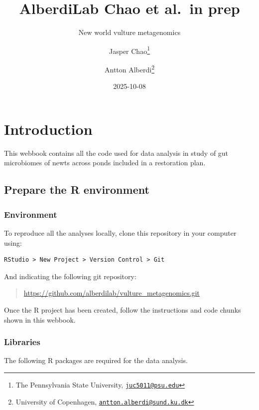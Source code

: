 \documentclass[
]{book}
\title{AlberdiLab \textbar{} Chao et al.~in prep}
\subtitle{New world vulture metagenomics}
\author{Jasper Chao\footnote{The Pennsylvania State University,
  \href{mailto:juc5011@psu.edu}{\nolinkurl{juc5011@psu.edu}}} \and Antton
Alberdi\footnote{University of Copenhagen,
  \href{mailto:antton.alberdi@sund.ku.dk}{\nolinkurl{antton.alberdi@sund.ku.dk}}}}
\date{2025-10-08}
\begin{document}
\frontmatter
\maketitle

\mainmatter
\chapter{Introduction}\label{introduction}

This webbook contains all the code used for data analysis in study of
gut microbiomes of newts across ponds included in a restoration plan.

\section{Prepare the R environment}\label{prepare-the-r-environment}

\subsection{Environment}\label{environment}

To reproduce all the analyses locally, clone this repository in your
computer using:

\begin{verbatim}
RStudio > New Project > Version Control > Git
\end{verbatim}

And indicating the following git repository:

\begin{quote}
\url{https://github.com/alberdilab/vulture_metagenomics.git}
\end{quote}

Once the R project has been created, follow the instructions and code
chunks shown in this webbook.

\subsection{Libraries}\label{libraries}

The following R packages are required for the data analysis.
\end{document}
